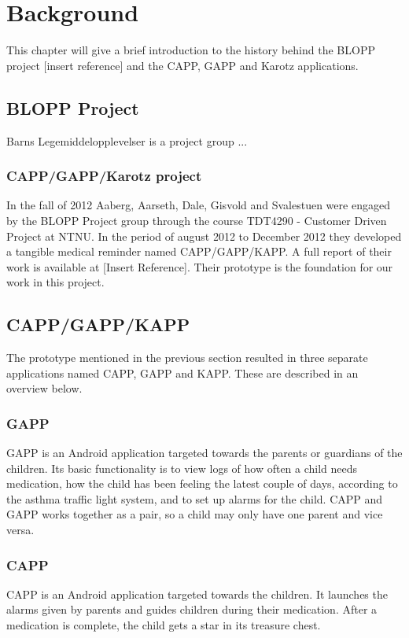\chapter{Background}
\label{chp:background}


This chapter will give a brief introduction to the history behind the BLOPP project [insert reference] and the CAPP, GAPP and Karotz applications.


\section{BLOPP Project}
\label{sec:bloppproject}
Barns Legemiddelopplevelser is a project group ...

\subsection{CAPP/GAPP/Karotz project}
In the fall of 2012 Aaberg, Aarseth, Dale, Gisvold and Svalestuen were engaged by the BLOPP Project group through the course TDT4290 - Customer Driven Project \cite{customerdrivenntnu} at NTNU. In the period of august 2012 to December 2012 they developed a tangible medical reminder named CAPP/GAPP/KAPP. A full report of their work is available at [Insert Reference]. 
Their prototype is the foundation for our work in this project.


\section{CAPP/GAPP/KAPP}
\label{sec:cappgappkapp}
The prototype mentioned in the previous section resulted in three separate applications named CAPP, GAPP and KAPP. These are described in an overview below.  

\subsection{GAPP}
GAPP is an Android application targeted towards the parents or guardians of the children. 
Its basic functionality is to view logs of how often a child needs medication, how the child has been feeling the latest couple of days, according to the asthma traffic light system, and to set up alarms for the child. 
CAPP and GAPP works together as a pair, so a child may only have one parent and vice versa. %


\subsection{CAPP}
CAPP is an Android application targeted towards the children. It launches the alarms given by parents and guides children during their medication. After a medication is complete, the child gets a star in its treasure chest.    

